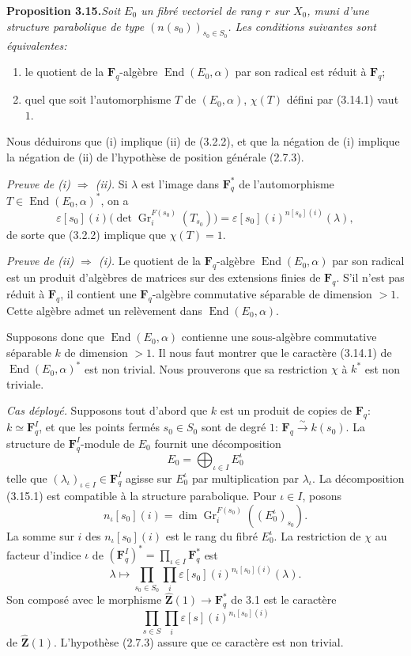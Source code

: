 \documentclass[11pt]{article}
\newcommand{\Fq}{\mathbf{F}_q}
\newcommand{\End}{\operatorname{End}}
\newcommand{\Zhat}{\widehat{\mathbf{Z}}}
\newcommand{\Gr}{\operatorname{Gr}}
\begin{document}
\noindent\textbf{Proposition 3.15.}\quad\textit{Soit \(E_0\) un fibré vectoriel de rang \(r\) sur \(X_0\), muni d'une structure parabolique de type \((n(s_0))_{s_0\in S_0}\). Les conditions suivantes sont équivalentes:}
\begin{enumerate}[label=(\roman*),leftmargin=2.5em]
\item le quotient de la \(\Fq\)-algèbre \(\End(E_0,\alpha)\) par son radical est réduit à \(\Fq\);
\item quel que soit l'automorphisme \(T\) de \((E_0,\alpha)\), \(\chi(T)\) défini par (3.14.1) vaut \(1\).
\end{enumerate}

Nous déduirons que (i) implique (ii) de (3.2.2), et que la négation de (i) implique la négation de (ii) de l'hypothèse de position générale (2.7.3).

\textit{Preuve de (i) \(\Rightarrow\) (ii).} Si \(\lambda\) est l'image dans \(\Fq^*\) de l'automorphisme \(T\in\End(E_0,\alpha)^*\), on a
\[
\varepsilon[s_0](i)\bigl(\det\Gr_i^{F(s_0)}(T_{s_0})\bigr)=\varepsilon[s_0](i)^{n[s_0](i)}(\lambda),
\]
de sorte que (3.2.2) implique que \(\chi(T)=1\).

\textit{Preuve de (ii) \(\Rightarrow\) (i).} Le quotient de la \(\Fq\)-algèbre \(\End(E_0,\alpha)\) par son radical est un produit d'algèbres de matrices sur des extensions finies de \(\Fq\). S'il n'est pas réduit à \(\Fq\), il contient une \(\Fq\)-algèbre commutative séparable de dimension \(>1\). Cette algèbre admet un relèvement dans \(\End(E_0,\alpha)\).

Supposons donc que \(\End(E_0,\alpha)\) contienne une sous-algèbre commutative séparable \(k\) de dimension \(>1\). Il nous faut montrer que le caractère (3.14.1) de \(\End(E_0,\alpha)^*\) est non trivial. Nous prouverons que sa restriction \(\chi\) à \(k^*\) est non triviale.

\textit{Cas déployé.} Supposons tout d'abord que \(k\) est un produit de copies de \(\Fq\): \(k\simeq\Fq^I\), et que les points fermés \(s_0\in S_0\) sont de degré \(1\): \(\Fq\xrightarrow{\sim}k(s_0)\). La structure de \(\Fq^I\)-module de \(E_0\) fournit une décomposition
\begin{equation}
  E_0=\bigoplus_{\iota\in I}E_0^{\iota}
\tag{3.15.1}
\end{equation}
telle que \((\lambda_\iota)_{\iota\in I}\in\Fq^I\) agisse sur \(E_0^\iota\) par multiplication par \(\lambda_\iota\). La décomposition (3.15.1) est compatible à la structure parabolique. Pour \(\iota\in I\), posons
\[
  n_\iota[s_0](i)=\dim\Gr_i^{F(s_0)}((E_0^\iota)_{s_0}).
\]
La somme sur \(i\) des \(n_\iota[s_0](i)\) est le rang du fibré \(E_0^\iota\). La restriction de \(\chi\) au facteur d'indice \(\iota\) de \((\Fq^I)^*=\prod_{\iota\in I}\Fq^*\) est
\begin{equation}
  \lambda\longmapsto\prod_{s_0\in S_0}\prod_i\varepsilon[s_0](i)^{n_\iota[s_0](i)}(\lambda).
\tag{3.15.2}
\end{equation}
Son composé avec le morphisme \(\Zhat(1)\to\Fq^*\) de 3.1 est le caractère
\[
  \prod_{s\in S}\prod_i\varepsilon[s](i)^{n_\iota[s_0](i)}
\]
de \(\Zhat(1)\). L'hypothèse (2.7.3) assure que ce caractère est non trivial.
\end{document}
